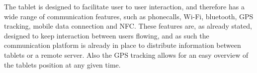 The tablet is designed to facilitate user to user interaction, and therefore has a wide range of communication features, such as phonecalls, Wi-Fi, bluetooth, GPS tracking, mobile data connection and NFC. These features are, as already stated, designed to keep interaction between users flowing, and as such the communication platform is already in place to distribute information between tablets or a remote server. Also the GPS tracking allows for an easy overview of the tablets position at any given time.
